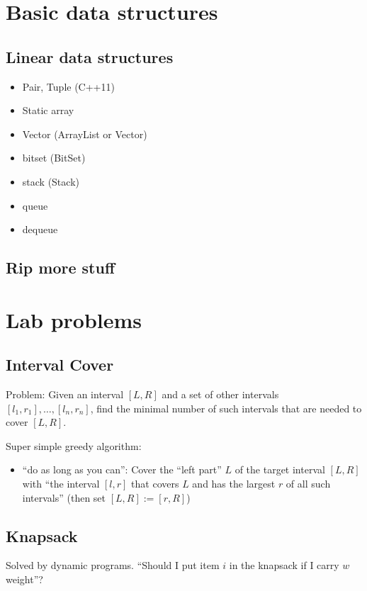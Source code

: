 \documentclass{article}
\begin{document}
\section{Basic data structures}
\subsection{Linear data structures}
\begin{itemize}
    \item Pair, Tuple (C++11)
    \item Static array
    \item Vector (ArrayList or Vector)
    \item bitset (BitSet)
    \item stack (Stack)
    \item queue
    \item dequeue
\end{itemize}

\subsection{Rip more stuff}

\section{Lab problems}

\subsection{Interval Cover}
Problem: Given an interval $[L,R]$ and a set of other intervals
${[l_1,r_1], \ldots , [l_n,r_n]}$, find the minimal number of such intervals
that are needed to cover $[L, R]$.

Super simple greedy algorithm:
\begin{itemize}
    \item ``do as long as you can'': Cover the ``left part'' $L$ of the target interval
$[L,R]$ with ``the interval $[l,r]$ that covers $L$ and has the largest $r$ of
all such intervals'' (then set $[L, R] := [r,R]$)
\end{itemize}

\subsection{Knapsack}
Solved by dynamic programs. ``Should I put item $i$ in the knapsack if I carry
$w$ weight''?
\end{document}
